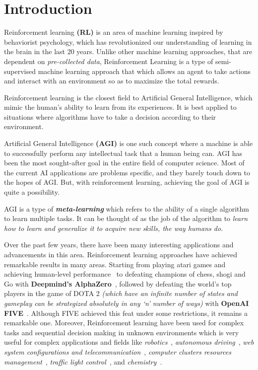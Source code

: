 
\chapter{Introduction}\label{chapter:introduction}

Reinforcement learning \textbf{(\gls{RL})} is an area of machine learning inspired by behaviorist psychology, which has revolutionized our understanding of learning in the brain in the last 20 years. Unlike other machine learning approaches, that are dependent on \textit{pre-collected data}, Reinforcement Learning is a type of semi-supervised machine learning approach that which allows an agent to take actions and interact with an environment so as to maximize the total rewards.

Reinforcement learning is the closest field to Artificial General Intelligence, which mimic the human’s ability to learn from its experiences. It is best applied to situations where algorithms have to take a decision according to their environment.

Artificial General Intelligence \textbf{(AGI)} is one such concept where a machine is able to successfully perform any intellectual task that a human being can. AGI has been the most sought-after goal in the entire field of computer science. Most of the current AI applications are problems specific, and they barely touch down to the hopes of AGI. But, with reinforcement learning, achieving the goal of AGI is quite a possibility.

AGI is a type of \textit{\textbf{meta-learning}} which refers to the ability of a single algorithm to learn multiple tasks. It can be thought of as the job of the algorithm to \textit{learn how to learn and generalize it to acquire new skills, the way humans do.}

Over the past few years, there have been many interesting applications and advancements in this area. Reinforcement learning approaches have achieved remarkable results in many areas. Starting from playing atari games and achieving human-level performance~\parencite{mnih2015human} to defeating champions of chess, shogi and Go with \textbf{Deepmind's AlphaZero}~\parencite{silver2017mastering}, followed by defeating the world’s top players in the game of DOTA 2 \textit{(which  have an infinite number of states and gameplay can be strategized absolutely in any ‘n’ number of ways)} with \textbf{OpenAI FIVE}~\parencite{OpenAI_dota}. Although FIVE achieved this feat under some restrictions, it remains a remarkable one. Moreover, Reinforcement learning have been used for complex tasks and sequential decision making in unknown environments which is very useful for complex applications and fields like \textit{robotics}~\parencite{kober2013reinforcement, levine2016end, 45926, singh2019end}, \textit{autonomous driving}~\parencite{sallab2017deep, xu2018zero}, \textit{web system configurations and telecommunication}~\parencite{bu2009reinforcement}, \textit{computer clusters resources management}~\parencite{mao2016resource}, \textit{traffic light control}~\parencite{arel2010reinforcement}, and \textit{chemistry}~\parencite{zhou2017optimizing}.


